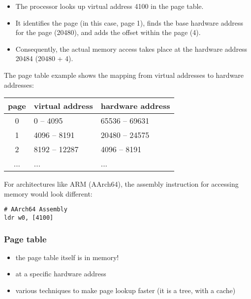 \documentclass[12pt]{article}
\begin{document}
\begin{itemize}
    \item The processor looks up virtual address 4100 in the page table.
    \item It identifies the page (in this case, page 1), finds the base hardware address for the page (20480), and adds the offset within the page (4).
    \item Consequently, the actual memory access takes place at the hardware address 20484 (20480 + 4).
\end{itemize}

The page table example shows the mapping from virtual addresses to hardware addresses:\\

\begin{tabular}{|c|l|l|}
\hline
\textbf{page} & \textbf{virtual address} & \textbf{hardware address} \\
\hline
0 & 0 -- 4095 & 65536 -- 69631 \\
1 & 4096 -- 8191 & 20480 -- 24575 \\
2 & 8192 -- 12287 & 4096 -- 8191 \\
... & ... & ... \\
\hline
\end{tabular}

\vspace{3.5mm}
For architectures like ARM (AArch64), the assembly instruction for accessing memory would look different:

\begin{lstlisting}
# AArch64 Assembly
ldr w0, [4100]
\end{lstlisting}





\subsubsection{Page table}
\begin{itemize}
    \item the page table itself is in memory!
    \item at a specific hardware address
    \item various techniques to make page lookup faster (it is a tree, with a cache)
\end{itemize}
\end{document}
